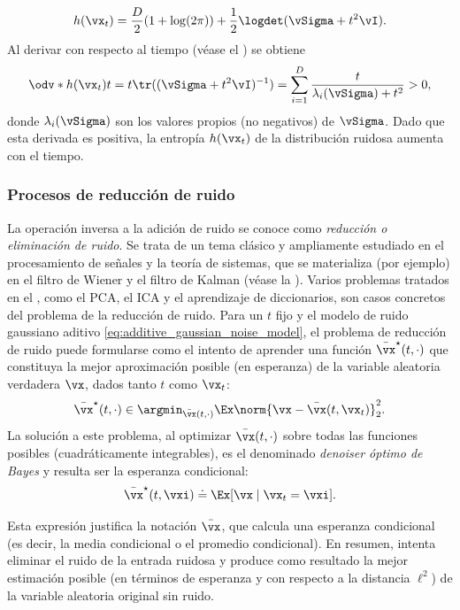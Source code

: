 \documentclass[../../book-main.tex]{subfiles}
\begin{document}
\begin{example}
\begin{equation}
        h(\vx_{t}) = \frac{D}{2}(1 + \log(2\pi)) +
        \frac{1}{2}\logdet(\vSigma + t^{2}\vI).
    \end{equation}
    Al derivar con respecto al tiempo (véase el )
    se obtiene
    \begin{equation}
        \odv*{h(\vx_{t})}{t} = t\tr((\vSigma + t^{2}\vI)^{-1}) =
        \sum_{i = 1}^{D}\frac{t}{\lambda_{i}(\vSigma) + t^{2}} > 0,
    \end{equation}
    donde \(\lambda_{i}(\vSigma)\) son los valores propios (no negativos) de
    \(\vSigma\). Dado que esta derivada es positiva, la entropía
    \(h(\vx_{t})\) de la distribución ruidosa aumenta con el tiempo.
\end{example}

\subsubsection{Procesos de reducción de ruido}
La operación inversa a la adición de ruido se conoce como \textit{reducción o eliminación de ruido}.
Se trata de un tema clásico y ampliamente estudiado en el procesamiento de señales y
la teoría de sistemas, que se materializa (por ejemplo) en el filtro de Wiener y
el filtro de Kalman (véase la ). Varios problemas tratados en
el , como el PCA, el ICA y el aprendizaje de diccionarios, son
casos concretos del problema de la reducción de ruido. Para un \(t\) fijo y
el modelo de ruido gaussiano aditivo
\eqref{eq:additive_gaussian_noise_model}, el problema de reducción de ruido puede
formularse como el intento de aprender una función \(\bar{\vx}^{\star}(t,
\cdot)\) que constituya la mejor aproximación posible (en esperanza)
de la variable aleatoria verdadera \(\vx\), dados tanto \(t\) como \(\vx_{t}\):
\begin{equation}\label{eq:denoising_loss}
    \bar{\vx}^{\star}(t, \cdot) \in \argmin_{\bar{\vx}(t,
    \cdot)} \Ex \norm{\vx - \bar{\vx}(t, \vx_{t})}_{2}^{2}.
\end{equation}
La solución a este problema, al optimizar \(\bar{\vx}(t, \cdot)\)
sobre todas las funciones posibles (cuadráticamente integrables), es el denominado
\textit{denoiser óptimo de Bayes} y resulta ser la esperanza condicional:
\begin{equation}\label{eq:optimal_denoiser}
    \bar{\vx}^{\star}(t, \vxi) \doteq \Ex[\vx \mid \vx_{t} = \vxi].
\end{equation}

Esta expresión justifica la notación \(\bar{\vx}\), que calcula
una esperanza condicional (es decir, la media condicional o el promedio
condicional). En resumen, intenta eliminar el ruido de la entrada ruidosa
y produce como resultado la mejor estimación posible (en términos de esperanza y con
respecto a la distancia \(\ell^{2}\)) de la variable aleatoria original sin ruido.
\end{document}
